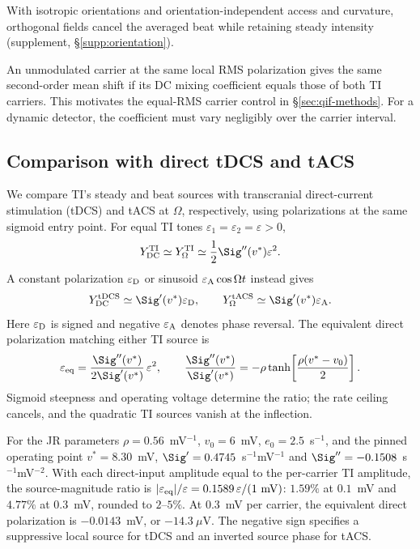 With isotropic orientations and orientation-independent access and curvature,
orthogonal fields cancel the averaged beat while retaining steady intensity
(supplement, \S\ref{supp:orientation}).
\ifjne\else

\fi

An unmodulated carrier at the same local RMS polarization gives the same
second-order mean shift if its DC mixing coefficient equals those of both
TI carriers. This motivates the equal-RMS carrier control in
\S\ref{sec:qif-methods}. For a dynamic detector, the coefficient must vary
negligibly over the carrier interval.

\subsection{Comparison with direct tDCS and tACS}\label{sec:direct-comparison}
We compare TI's steady and beat sources with transcranial direct-current
stimulation (tDCS) and tACS at $\Omega$, respectively, using polarizations
at the same sigmoid entry point. For equal TI tones
$\varepsilon_1=\varepsilon_2=\varepsilon>0$,
\[
Y_{\rm DC}^{\rm TI}\simeq Y_\Omega^{\rm TI}
\simeq \frac12\Sig''(v^*)\varepsilon^2.
\]
A constant polarization $\varepsilon_{\rm D}$ or sinusoid
$\varepsilon_{\rm A}\cos\Omega t$ instead gives
\[
Y_{\rm DC}^{\rm tDCS}\simeq\Sig'(v^*)\varepsilon_{\rm D},
\qquad
Y_\Omega^{\rm tACS}\simeq\Sig'(v^*)\varepsilon_{\rm A}.
\]
Here $\varepsilon_{\rm D}$ is signed and negative $\varepsilon_{\rm A}$
denotes phase reversal. The equivalent direct polarization matching either
TI source is
\[
\varepsilon_{\rm eq}
=\frac{\Sig''(v^*)}{2\Sig'(v^*)}\,\varepsilon^2,
\qquad
\frac{\Sig''(v^*)}{\Sig'(v^*)}
=-\rho\tanh\!\left[\frac{\rho(v^*-v_0)}2\right].
\]
Sigmoid steepness and operating voltage determine the ratio; the rate ceiling
cancels, and the quadratic TI sources vanish at the inflection.

For the JR parameters $\rho=0.56$~mV$^{-1}$, $v_0=6$~mV,
$e_0=2.5$~s$^{-1}$, and the pinned operating point $v^*=8.30$~mV,
$\Sig'=0.4745$~s$^{-1}$mV$^{-1}$ and
$\Sig''=-0.1508$~s$^{-1}$mV$^{-2}$. With each direct-input amplitude
equal to the per-carrier TI amplitude, the source-magnitude ratio is
$|\varepsilon_{\rm eq}|/\varepsilon
=0.1589\,\varepsilon/(1~\mathrm{mV})$:
$1.59\%$ at $0.1$~mV and $4.77\%$ at $0.3$~mV, rounded to $2$--$5\%$.
At $0.3$~mV per carrier, the equivalent direct polarization is
$-0.0143$~mV, or $-14.3~\mu$V. The negative sign specifies a suppressive
local source for tDCS and an inverted source phase for tACS.


